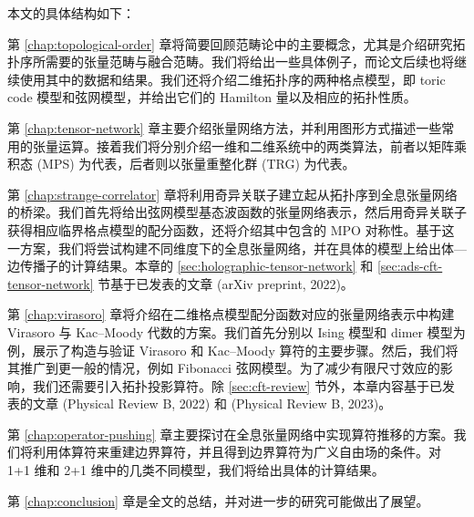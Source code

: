 本文的具体结构如下：

第 \ref{chap:topological-order} 章将简要回顾范畴论中的主要概念，尤其是介绍研究拓扑序所需要的张量范畴与融合范畴。我们将给出一些具体例子，而论文后续也将继续使用其中的数据和结果。我们还将介绍二维拓扑序的两种格点模型，即 toric code 模型和弦网模型，并给出它们的 Hamilton 量以及相应的拓扑性质。

第 \ref{chap:tensor-network} 章主要介绍张量网络方法，并利用图形方式描述一些常用的张量运算。接着我们将分别介绍一维和二维系统中的两类算法，前者以矩阵乘积态 (MPS) 为代表，后者则以张量重整化群 (TRG) 为代表。

第 \ref{chap:strange-correlator} 章将利用奇异关联子建立起从拓扑序到全息张量网络的桥梁。我们首先将给出弦网模型基态波函数的张量网络表示，然后用奇异关联子获得相应临界格点模型的配分函数，还将介绍其中包含的 MPO 对称性。基于这一方案，我们将尝试构建不同维度下的全息张量网络，并在具体的模型上给出体—边传播子的计算结果。本章的 \ref{sec:holographic-tensor-network} 和 \ref{sec:ads-cft-tensor-network} 节基于已发表的文章 (arXiv preprint, 2022)。

第 \ref{chap:virasoro} 章将介绍在二维格点模型配分函数对应的张量网络表示中构建 Virasoro 与 Kac--Moody 代数的方案。我们首先分别以 Ising 模型和 dimer 模型为例，展示了构造与验证 Virasoro 和 Kac--Moody 算符的主要步骤。然后，我们将其推广到更一般的情况，例如 Fibonacci 弦网模型。为了减少有限尺寸效应的影响，我们还需要引入拓扑投影算符。除 \ref{sec:cft-review} 节外，本章内容基于已发表的文章 (Physical Review B, 2022) 和 (Physical Review B, 2023)。

第 \ref{chap:operator-pushing} 章主要探讨在全息张量网络中实现算符推移的方案。我们将利用体算符来重建边界算符，并且得到边界算符为广义自由场的条件。对 1+1 维和 2+1 维中的几类不同模型，我们将给出具体的计算结果。

第 \ref{chap:conclusion} 章是全文的总结，并对进一步的研究可能做出了展望。

\endgroup
